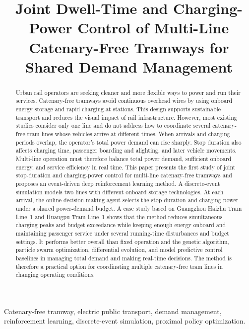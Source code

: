 \documentclass[conference]{IEEEtran}
\title{Joint Dwell-Time and Charging-Power Control of Multi-Line Catenary-Free Tramways for Shared Demand Management}
\author{
\IEEEauthorblockN{Jun-Jie Zhao}
\IEEEauthorblockA{School of Electrical and Computer Engineering\\
The University of Sydney\\
Sydney, Australia}
}
\begin{document}
\maketitle

\begin{abstract}
Urban rail operators are seeking cleaner and more flexible ways to power and run their services. Catenary-free tramways avoid continuous overhead wires by using onboard energy storage and rapid charging at stations. This design supports sustainable transport and reduces the visual impact of rail infrastructure. However, most existing studies consider only one line and do not address how to coordinate several catenary-free tram lines whose vehicles arrive at different times. When arrivals and charging periods overlap, the operator's total power demand can rise sharply. Stop duration also affects charging time, passenger boarding and alighting, and later vehicle movements. Multi-line operation must therefore balance total power demand, sufficient onboard energy, and service efficiency in real time. This paper presents the first study of joint stop-duration and charging-power control for multi-line catenary-free tramways and proposes an event-driven deep reinforcement learning method. A discrete-event simulation models two lines with different onboard storage technologies. At each arrival, the online decision-making agent selects the stop duration and charging power under a shared power-demand budget. A case study based on Guangzhou Haizhu Tram Line~1 and Huangpu Tram Line~1 shows that the method reduces simultaneous charging peaks and budget exceedance while keeping enough energy onboard and maintaining passenger service under several running-time disturbances and budget settings. It performs better overall than fixed operation and the genetic algorithm, particle swarm optimization, differential evolution, and model predictive control baselines in managing total demand and making real-time decisions. The method is therefore a practical option for coordinating multiple catenary-free tram lines in changing operating conditions.
\end{abstract}

\begin{IEEEkeywords}
Catenary-free tramway, electric public transport, demand management, reinforcement learning, discrete-event simulation, proximal policy optimization.
\end{IEEEkeywords}
\end{document}
